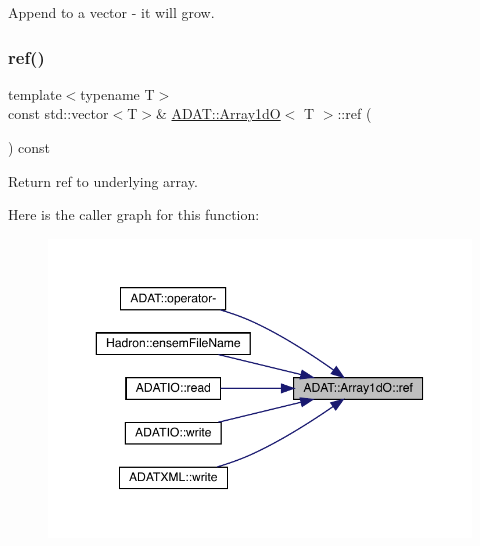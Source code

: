 Append to a vector -\/ it will grow. 

\mbox{\label{classADAT_1_1Array1dO_a3b74880db3b0d48e29fb28f80a283352}} 
\subsubsection{\texorpdfstring{ref()}{ref()}\hspace{0.1cm}{\footnotesize\ttfamily [1/4]}}
{\footnotesize\ttfamily template$<$typename T$>$ \\
const std\+::vector$<$T$>$\& \mbox{\hyperlink{classADAT_1_1Array1dO}{A\+D\+A\+T\+::\+Array1dO}}$<$ T $>$\+::ref (\begin{DoxyParamCaption}{ }\end{DoxyParamCaption}) const\hspace{0.3cm}{\ttfamily [inline]}}



Return ref to underlying array. 

Here is the caller graph for this function\+:\nopagebreak
\begin{figure}[H]
\begin{center}
\leavevmode
\includegraphics[width=350pt]{db/d5c/classADAT_1_1Array1dO_a3b74880db3b0d48e29fb28f80a283352_icgraph}
\end{center}
\end{figure}
\mbox{\label{classADAT_1_1Array1dO_a3b74880db3b0d48e29fb28f80a283352}} 
